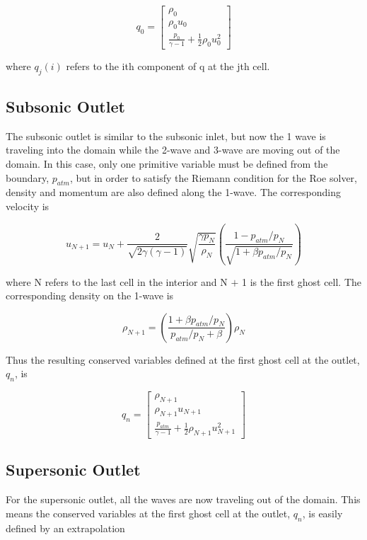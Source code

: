 \documentclass{article}%
\numberwithin{equation}{section}
\begin{document}
\begin{equation}
q_0 =  \left[ \begin{array}{c} \rho_0 \\ \rho_0 u_0 \\ \frac{p_0}{\gamma - 1} + \frac{1}{2} \rho_0 u_0^2 \end{array} \right]
\end{equation}

where $q_j(i)$ refers to the ith component of q at the jth cell.

\subsection{Subsonic Outlet}
The subsonic outlet is similar to the subsonic inlet, but now the 1 wave is traveling into the domain while the 2-wave and 3-wave are moving out of the domain. In this case, only one primitive variable must be defined from the boundary, $p_{atm}$, but in order to satisfy the Riemann condition for the Roe solver, density and momentum are also defined along the 1-wave. The corresponding velocity is 

\begin{equation}
u_{N+1} = u_N + \frac{2}{\sqrt{2 \gamma (\gamma - 1)}} \sqrt{\frac{\gamma p_N}{\rho_N}} \left( \frac{1 - p_{atm} / p_N}{\sqrt{1 + \beta p_{atm} / p_N}} \right)
\end{equation}

where N refers to the last cell in the interior and N $+$ 1 is the first ghost cell. The corresponding density on the 1-wave is

\begin{equation}
\rho_{N+1} = \left( \frac{1 + \beta p_{atm} / p_N}{p_{atm} /p_N + \beta} \right) \rho_N
\end{equation}

Thus the resulting conserved variables defined at the first ghost cell at the outlet, $q_n$, is

\begin{equation}
q_n =  \left[ \begin{array}{c} \rho_{N+1} \\ \rho_{N+1} u_{N+1} \\ \frac{p_{atm}}{\gamma - 1} + \frac{1}{2} \rho_{N+1} u_{N+1}^2 \end{array} \right]
\end{equation}

\subsection{Supersonic Outlet}
For the supersonic outlet, all the waves are now traveling out of the domain. This means the conserved variables at the first ghost cell at the outlet, $q_n$, is easily defined by an extrapolation 
\end{document}
